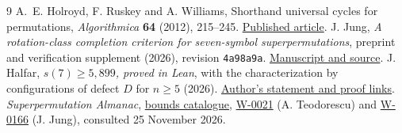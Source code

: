 \documentclass[11pt]{article}
\begin{document}
\small
\begin{thebibliography}{9}\setlength{\itemsep}{2pt}
 A.~E. Holroyd, F. Ruskey and A. Williams, Shorthand universal cycles for permutations, \emph{Algorithmica} \textbf{64} (2012), 215--245. \href{https://doi.org/10.1007/s00453-011-9544-z}{Published article}.
 J. Jung, \emph{A rotation-class completion criterion for seven-symbol superpermutations}, preprint and verification supplement (2026), revision \texttt{4a98a9a}. \href{https://github.com/aistaralchemist-cyber/superpermutation-completion-7/tree/4a98a9ae38cd6ec82c0ee0622a49419c3d98d453}{Manuscript and source}.
 J. Halfar, \emph{$s(7)\ge5{,}899$, proved in Lean}, with the characterization by configurations of defect $D$ for $n\ge5$ (2026). \href{https://groups.google.com/g/superpermutators/c/dmBTmhy0a1A}{Author's statement and proof links}.
 \emph{Superpermutation Almanac}, \href{https://superpermutations.com/}{bounds catalogue}, \href{https://superpermutations.com/w/W-0021}{W-0021} (A. Teodorescu) and \href{https://superpermutations.com/w/W-0166}{W-0166} (J. Jung), consulted 25 November 2026.
\end{thebibliography}
\end{document}
